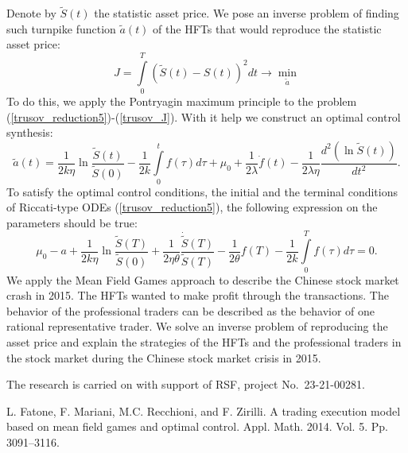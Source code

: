 \documentclass[12pt]{llncs}
\begin{document}
Denote by $\tilde{S}(t)$ the statistic asset price. We pose an inverse problem of finding such turnpike function $\tilde{a}(t)$ of the HFTs that would reproduce the statistic asset price:
\begin{equation}\label{trusov_J}
	J = \int\limits_0^T \left(\tilde{S}(t) - S(t)\right)^2 dt \rightarrow \min\limits_{\tilde{a}}
\end{equation}
To do this, we apply the Pontryagin maximum principle to the problem (\ref{trusov_reduction5})-(\ref{trusov_J}). With it help we construct an optimal control synthesis:
\[
	\tilde{a}(t) = \frac{1}{2k\eta}\ln\frac{\tilde{S}(t)}{\tilde{S}(0)} - \frac{1}{2k}\int\limits_0^t f(\tau)d\tau + \mu_0 + \frac{1}{2\lambda}\dot{f}(t) - \frac{1}{2\lambda\eta}\frac{d^2\left(\ln\tilde{S}(t)\right)}{dt^2}.
\]
To satisfy the optimal control conditions, the initial and the terminal conditions of Riccati-type ODEs (\ref{trusov_reduction5}), the following expression on the parameters should be true:
\[
	\mu_0 - a + \frac{1}{2k\eta}\ln\frac{\tilde{S}(T)}{\tilde{S}(0)} + \frac{1}{2\eta\theta}\frac{\dot{\tilde{S}}(T)}{\tilde{S}(T)} - \frac{1}{2\theta}f(T) - \frac{1}{2k}\int\limits_0^T f(\tau)d\tau = 0.
\]
We apply the Mean Field Games approach to describe the Chinese stock market crash in 2015. The HFTs wanted to make profit through the transactions. The behavior of the professional traders can be described as the behavior of one rational representative trader. We solve an inverse problem of reproducing the asset price and explain the strategies of the HFTs and the professional traders in the stock market during the Chinese stock market crisis in 2015. 

The research is carried on with support of RSF, project No.~23-21-00281.

\begin{thebibliography}{9} %
 L. Fatone, F. Mariani, M.C. Recchioni, and F. Zirilli. A trading execution model based on mean field games
and optimal control.  Appl. Math. 2014. Vol. 5. Pp. 3091--3116.



\end{thebibliography}
\end{document}
